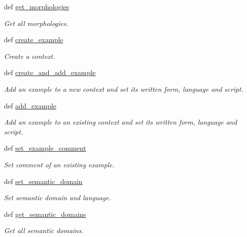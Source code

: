 \begin{DoxyCompactItemize}
def \hyperlink{classlmf_1_1src_1_1core_1_1lexical__entry_1_1_lexical_entry_a18ba5dfe76ff71f23635aff3b2d5560f}{get\+\_\+morphologies}
\begin{DoxyCompactList}\small\item\em Get all morphologies. \end{DoxyCompactList}\item 
def \hyperlink{classlmf_1_1src_1_1core_1_1lexical__entry_1_1_lexical_entry_a8de47b684e09a774bd97be2cd98a2b68}{create\+\_\+example}
\begin{DoxyCompactList}\small\item\em Create a context. \end{DoxyCompactList}\item 
def \hyperlink{classlmf_1_1src_1_1core_1_1lexical__entry_1_1_lexical_entry_ab8281dae44c97d12be3a9fe3a865d40b}{create\+\_\+and\+\_\+add\+\_\+example}
\begin{DoxyCompactList}\small\item\em Add an example to a new context and set its written form, language and script. \end{DoxyCompactList}\item 
def \hyperlink{classlmf_1_1src_1_1core_1_1lexical__entry_1_1_lexical_entry_acfdd422522c23eb7073da59ce09c764d}{add\+\_\+example}
\begin{DoxyCompactList}\small\item\em Add an example to an existing context and set its written form, language and script. \end{DoxyCompactList}\item 
def \hyperlink{classlmf_1_1src_1_1core_1_1lexical__entry_1_1_lexical_entry_a492011efb0c5c4dbe7312d3f4d7f8b5e}{set\+\_\+example\+\_\+comment}
\begin{DoxyCompactList}\small\item\em Set comment of an existing example. \end{DoxyCompactList}\item 
def \hyperlink{classlmf_1_1src_1_1core_1_1lexical__entry_1_1_lexical_entry_a215b437f217ce3e652380f74059403e1}{set\+\_\+semantic\+\_\+domain}
\begin{DoxyCompactList}\small\item\em Set semantic domain and language. \end{DoxyCompactList}\item 
def \hyperlink{classlmf_1_1src_1_1core_1_1lexical__entry_1_1_lexical_entry_afd064ec67db5c093665165b59162f94f}{get\+\_\+semantic\+\_\+domains}
\begin{DoxyCompactList}\small\item\em Get all semantic domains. \end{DoxyCompactList}\item 

\end{DoxyCompactItemize}

